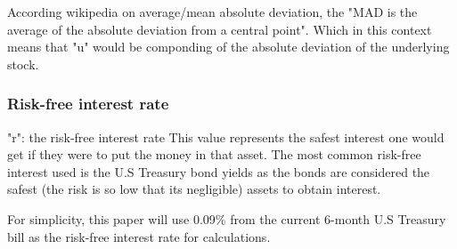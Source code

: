 \documentclass[12pt, letterpaper]{article}
\begin{document}
According wikipedia on average/mean absolute deviation, the "MAD is the average of the absolute deviation from a central point".
Which in this context means that "u" would be componding of the absolute deviation of the underlying stock.

\subsubsection*{Risk-free interest rate}

"r": the risk-free interest rate %
This value represents the safest interest one would get if they were to put the money in that asset.
The most common risk-free interest used is the U.S Treasury bond yields as the bonds are considered the safest (the risk is so low that its negligible) assets to obtain interest.

For simplicity, this paper will use 0.09\% from the current 6-month U.S Treasury bill as the risk-free interest rate for calculations.
\end{document}
